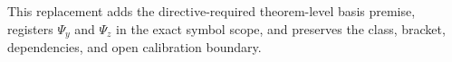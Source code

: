 This replacement adds the directive-required theorem-level basis premise, registers \(\Psi_y\) and \(\Psi_z\) in the exact symbol scope, and preserves the class, bracket, dependencies, and open calibration boundary.